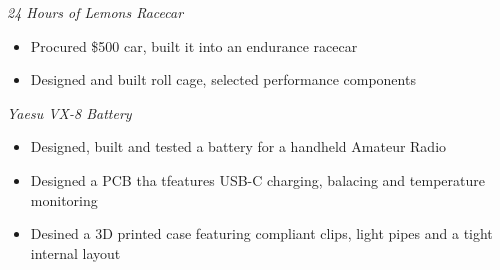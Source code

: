 \documentclass[line,mmmargin]{res}
\begin{document}
\begin{resume}
	{\sl 24 Hours of Lemons Racecar}
		\begin{itemize} \itemsep -2pt
			\item Procured \$500 car, built it into an endurance racecar
			\item Designed and built roll cage, selected performance components
		\end{itemize}
	\vspace{-10pt}
	{\sl Yaesu VX-8 Battery}
		\begin{itemize} \itemsep -2pt
			\item Designed, built and tested a battery for a
				handheld Amateur Radio
			\item Designed a PCB tha tfeatures USB-C charging,
				balacing  and temperature monitoring
			\item Desined a 3D printed case featuring compliant
				clips, light pipes and a tight internal layout
		\end{itemize}
	\vspace{-10pt}


\end{resume}
\end{document}
